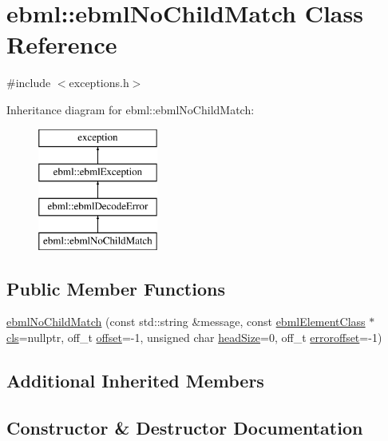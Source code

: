 \hypertarget{classebml_1_1ebmlNoChildMatch}{}\section{ebml\+:\+:ebml\+No\+Child\+Match Class Reference}
\label{classebml_1_1ebmlNoChildMatch}


{\ttfamily \#include $<$exceptions.\+h$>$}

Inheritance diagram for ebml\+:\+:ebml\+No\+Child\+Match\+:\begin{figure}[H]
\begin{center}
\leavevmode
\includegraphics[height=4.000000cm]{classebml_1_1ebmlNoChildMatch}
\end{center}
\end{figure}
\subsection*{Public Member Functions}
\begin{DoxyCompactItemize}
\item 
\mbox{\hyperlink{classebml_1_1ebmlNoChildMatch_aa4f5e655f9247308a8d066c06f213a7e}{ebml\+No\+Child\+Match}} (const std\+::string \&message, const \mbox{\hyperlink{classebml_1_1ebmlElementClass}{ebml\+Element\+Class}} $\ast$\mbox{\hyperlink{classebml_1_1ebmlDecodeError_a3568b4ea3cd5bd16b9510abfe269920f}{cls}}=nullptr, off\+\_\+t \mbox{\hyperlink{classebml_1_1ebmlDecodeError_ad32ac9b3dd52f1c11479085d9c665e0f}{offset}}=-\/1, unsigned char \mbox{\hyperlink{classebml_1_1ebmlDecodeError_a61a4d4856f0c779a1c216e45dc5a7c1e}{head\+Size}}=0, off\+\_\+t \mbox{\hyperlink{classebml_1_1ebmlDecodeError_acb525117e0109d9640fb5e8c546e9a02}{erroroffset}}=-\/1)
\end{DoxyCompactItemize}
\subsection*{Additional Inherited Members}


\subsection{Constructor \& Destructor Documentation}
\mbox{\label{classebml_1_1ebmlNoChildMatch_aa4f5e655f9247308a8d066c06f213a7e}} 
